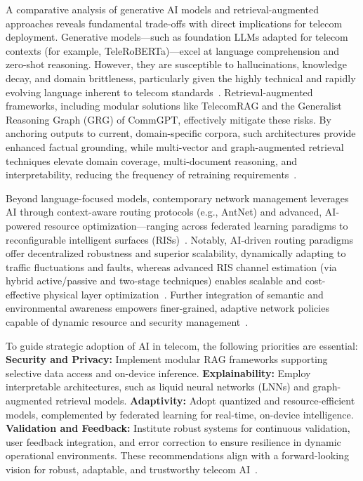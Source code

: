 \documentclass[sigconf]{acmart}
\begin{document}
A comparative analysis of generative AI models and retrieval-augmented approaches reveals fundamental trade-offs with direct implications for telecom deployment. Generative models—such as foundation LLMs adapted for telecom contexts (for example, TeleRoBERTa)—excel at language comprehension and zero-shot reasoning. However, they are susceptible to hallucinations, knowledge decay, and domain brittleness, particularly given the highly technical and rapidly evolving language inherent to telecom standards~\cite{ref7, ref16, ref20}. Retrieval-augmented frameworks, including modular solutions like TelecomRAG and the Generalist Reasoning Graph (GRG) of CommGPT, effectively mitigate these risks. By anchoring outputs to current, domain-specific corpora, such architectures provide enhanced factual grounding, while multi-vector and graph-augmented retrieval techniques elevate domain coverage, multi-document reasoning, and interpretability, reducing the frequency of retraining requirements~\cite{ref7, ref16}.

Beyond language-focused models, contemporary network management leverages AI through context-aware routing protocols (e.g., AntNet) and advanced, AI-powered resource optimization—ranging across federated learning paradigms to reconfigurable intelligent surfaces (RISs)~\cite{ref15, ref21, ref22, ref27}. Notably, AI-driven routing paradigms offer decentralized robustness and superior scalability, dynamically adapting to traffic fluctuations and faults, whereas advanced RIS channel estimation (via hybrid active/passive and two-stage techniques) enables scalable and cost-effective physical layer optimization~\cite{ref26, ref27}. Further integration of semantic and environmental awareness empowers finer-grained, adaptive network policies capable of dynamic resource and security management~\cite{ref15, ref20, ref21, ref28}.

To guide strategic adoption of AI in telecom, the following priorities are essential:
\textbf{Security and Privacy:} Implement modular RAG frameworks supporting selective data access and on-device inference.
\textbf{Explainability:} Employ interpretable architectures, such as liquid neural networks (LNNs) and graph-augmented retrieval models.
\textbf{Adaptivity:} Adopt quantized and resource-efficient models, complemented by federated learning for real-time, on-device intelligence.
\textbf{Validation and Feedback:} Institute robust systems for continuous validation, user feedback integration, and error correction to ensure resilience in dynamic operational environments.
These recommendations align with a forward-looking vision for robust, adaptable, and trustworthy telecom AI~\cite{ref7, ref16, ref17, ref18, ref19, ref20, ref21, ref22, ref23, ref26, ref27, ref28, ref30}.
\end{document}
